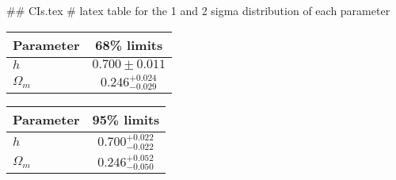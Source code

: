 ## CIs.tex
# latex table for the 1 and 2 sigma distribution of each parameter

\begin{tabular} { l  c}
 Parameter &  68\% limits\\
\hline
{\boldmath$h              $} & $0.700\pm 0.011            $\\
{\boldmath$\Omega_m       $} & $0.246^{+0.024}_{-0.029}   $\\
\hline
\end{tabular}

\begin{tabular} { l  c}
 Parameter &  95\% limits\\
\hline
{\boldmath$h              $} & $0.700^{+0.022}_{-0.022}   $\\
{\boldmath$\Omega_m       $} & $0.246^{+0.052}_{-0.050}   $\\
\hline
\end{tabular}
